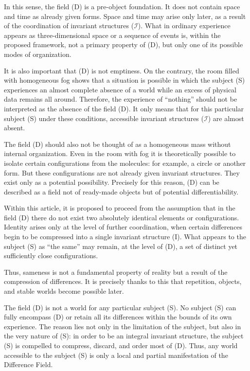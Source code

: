 \documentclass[aps,prd,onecolumn,nofootinbib,superscriptaddress]{revtex4-2} %
\begin{document}
    In this sense, the field (D) is a pre-object foundation. It does not contain space and time as already given forms. Space and time may arise only later, as a result of the coordination of invariant structures ($\mathcal{I}$). What in ordinary experience appears as three-dimensional space or a sequence of events is, within the proposed framework, not a primary property of (D), but only one of its possible modes of organization.

    It is also important that (D) is not emptiness. On the contrary, the room filled with homogeneous fog shows that a situation is possible in which the subject (S) experiences an almost complete absence of a world while an excess of physical data remains all around. Therefore, the experience of “nothing” should not be interpreted as the absence of the field (D). It only means that for this particular subject (S) under these conditions, accessible invariant structures ($\mathcal{I}$) are almost absent.

    The field (D) should also not be thought of as a homogeneous mass without internal organization. Even in the room with fog it is theoretically possible to isolate certain configurations from the molecules: for example, a circle or another form. But these configurations are not already given invariant structures. They exist only as a potential possibility. Precisely for this reason, (D) can be described as a field not of ready-made objects but of potential differentiability.

    Within this article, it is proposed to proceed from the assumption that in the field (D) there do not exist two absolutely identical elements or configurations. Identity arises only at the level of further coordination, when certain differences begin to be compressed into a single invariant structure (I). What appears to the subject (S) as “the same” may remain, at the level of (D), a set of distinct yet sufficiently close configurations.

    Thus, sameness is not a fundamental property of reality but a result of the compression of differences. It is precisely thanks to this that repetition, objects, and stable worlds become possible later.

    The field (D) is not a world for any particular subject (S). No subject (S) can fully encompass (D) or retain all its differences within the bounds of its own experience. The reason lies not only in the limitation of the subject, but also in the very nature of (S): in order to be an integral invariant structure, the subject (S) is compelled to compress, discard, and order most of (D). Thus, any world accessible to the subject (S) is only a local and partial manifestation of the Difference Field.
\end{document}
